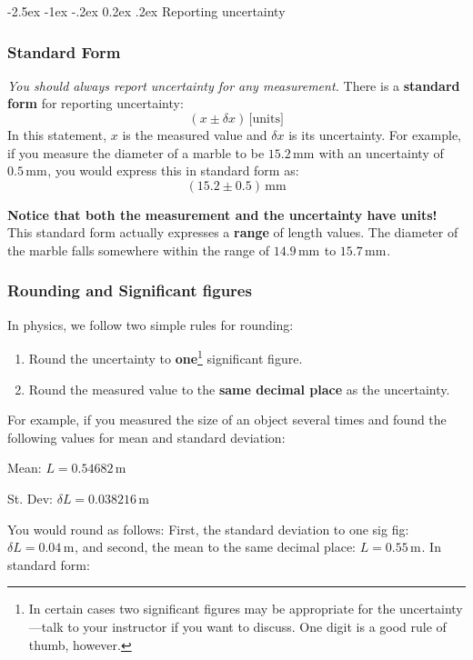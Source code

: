 \documentclass[11pt]{article}
\makeatletter
\renewcommand\u[2][]{\ensuremath{\,\text{#2}^{#1}}}
\renewcommand\subsection{\@startsection {subsection}{2}{\z@}%
     {-2.5ex \@plus -1ex \@minus -.2ex}%
     {0.2ex \@plus.2ex}%
    {\bfseries\large}}
\makeatother
\begin{document}
\subsection{Reporting uncertainty}

\subsubsection{Standard Form}
\textit{You should always report uncertainty for any measurement.} There is a 
\textbf{standard form} for reporting uncertainty:
\begin{equation}
(x \pm \delta x)\u{[units]}
\end{equation}
In this statement, $x$ is the measured value and $\delta x$ is its uncertainty. 
For example, if you measure the diameter of a marble to be $15.2\u{mm}$ with an 
uncertainty of $0.5\u{mm}$, you would express this in standard form as:
\begin{equation}
(15.2 \pm 0.5)\u{mm}
\end{equation}

\textbf{Notice that both the measurement and the uncertainty have units!} This 
standard form actually expresses a \textbf{range} of length values. The diameter 
of the marble falls somewhere within the range of $14.9\u{mm}$ to $15.7\u{mm}$.

\subsubsection{Rounding and Significant figures}

In physics, we follow two simple rules for rounding:
\begin{enumerate}
\item Round the uncertainty to \textbf{one}\footnote{In certain cases two significant figures may be appropriate for the uncertainty---talk to your instructor if you want to discuss. One digit is a good rule of thumb, however.} significant figure.
\item Round the measured value to the \textbf{same decimal place} as the 
uncertainty.
\end{enumerate}

For example, if you measured the size of an object several times and found the following 
values for mean and standard deviation:

Mean: $L = 0.54682\u{m}$

St. Dev: $\delta L = 0.038216\u{m}$

You would round as follows: First, the standard deviation to one sig fig: 
$\delta L = 0.04\u{m}$, and second, the mean to the same decimal place: $L = 0.55\u{m}$. In standard form:
\end{document}
